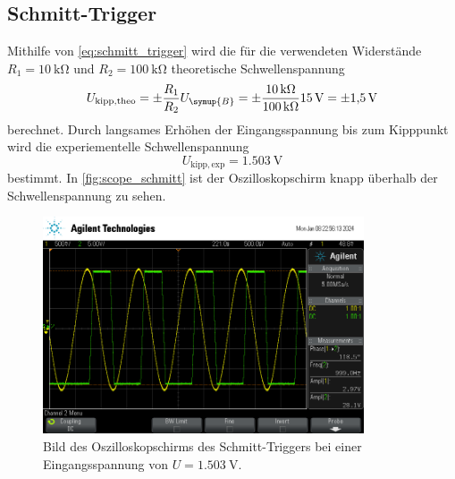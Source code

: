 \subsection{Schmitt-Trigger}
Mithilfe von \autoref{eq:schmitt_trigger} wird die für die verwendeten Widerstände $R_1=\qty{10}{\kilo\ohm}$ und $R_2=\qty{100}{\kilo\ohm}$ theoretische Schwellenspannung 
\begin{equation*}
  U_{\mathrm{kipp, theo}} = \pm \frac{R_1}{R_2} U_{\symup{B}} = \pm \frac{\qty{10}{\kilo\ohm}}{\qty{100}{\kilo\ohm}} \qty{15}{\volt} = \pm\qty{1,5}{\volt}
\end{equation*}
berechnet.
Durch langsames Erhöhen der Eingangsspannung bis zum Kipppunkt wird die experiementelle Schwellenspannung 
\begin{equation*}
  U_{\mathrm{kipp, exp}} = \qty{1,503}{\volt}
\end{equation*}
bestimmt. In \autoref{fig:scope_schmitt} ist der Oszilloskopschirm knapp überhalb der Schwellenspannung zu sehen.
\begin{figure}
  \centering
  \includegraphics[height=6.4cm]{content/scope/scope_15.png}
  \caption{Bild des Oszilloskopschirms des Schmitt-Triggers bei einer Eingangsspannung von $U=\qty{1,503}{\volt}$.}
  \label{fig:scope_schmitt}
\end{figure} 

